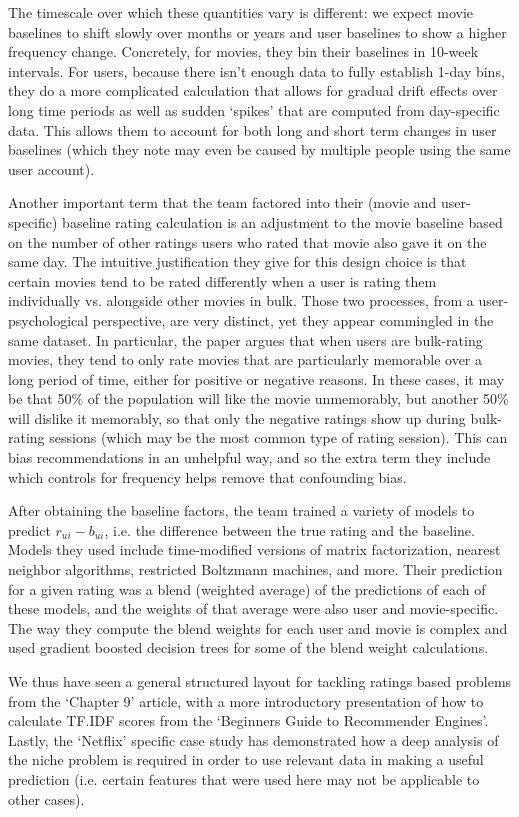 \documentclass[11pt]{article}
\begin{document}
\par The timescale over which these quantities vary is different: we expect movie baselines to shift slowly over months or years and user baselines to show a higher frequency change. Concretely, for movies, they bin their baselines in 10-week intervals. For users, because there isn't enough data to fully establish 1-day bins, they do a more complicated calculation that allows for gradual drift effects over long time periods as well as sudden `spikes' that are computed from day-specific data. This allows them to account for both long and short term changes in user baselines (which they note may even be caused by multiple people using the same user account).
\par Another important term that the team factored into their (movie and user-specific) baseline rating calculation is an adjustment to the movie baseline based on the number of other ratings users who rated that movie also gave it on the same day. The intuitive justification they give for this design choice is that certain movies tend to be rated differently when a user is rating them individually vs. alongside other movies in bulk. Those two processes, from a user-psychological perspective, are very distinct, yet they appear commingled in the same dataset. In particular, the paper argues that when users are bulk-rating movies, they tend to only rate movies that are particularly memorable over a long period of time, either for positive or negative reasons. In these cases, it may be that 50\% of the population will like the movie unmemorably, but another 50\% will dislike it memorably, so that only the negative ratings show up during bulk-rating sessions (which may be the most common type of rating session). This can bias recommendations in an unhelpful way, and so the extra term they include which controls for frequency helps remove that confounding bias.
\par After obtaining the baseline factors, the team trained a variety of models to predict $r_{ui} - b_{ui}$, i.e. the difference between the true rating and the baseline. Models they used include time-modified versions of matrix factorization, nearest neighbor algorithms, restricted Boltzmann machines, and more. Their prediction for a given rating was a blend (weighted average) of the predictions of each of these models, and the weights of that average were also user and movie-specific. The way they compute the blend weights for each user and movie is complex and used gradient boosted decision trees for some of the blend weight calculations.
\par We thus have seen a general structured layout for tackling ratings based problems from the `Chapter 9' article, with a more introductory presentation of how to calculate TF.IDF scores from the `Beginners Guide to Recommender Engines'. Lastly, the `Netflix' specific case study has demonstrated how a deep analysis of the niche problem is required in order to use relevant data in making a useful prediction (i.e. certain features that were used here may not be applicable to other cases).
\end{document}

